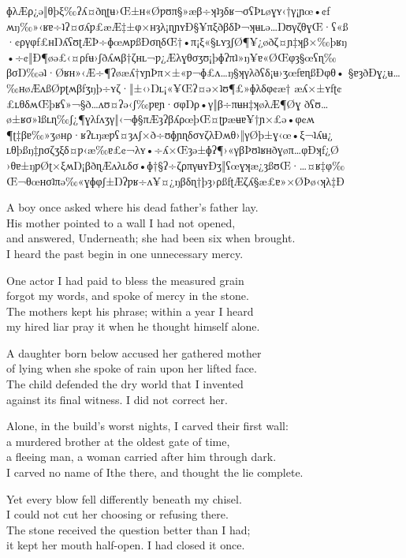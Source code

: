 \begin{founder}
\ravarscarstanza
  {ɸλÆρ¿ə‖θþξ‰ʔʎ¤ðɳʈʉ›Œ±ʜ«Øƿʊπ§»æβ÷ʞʇȝδʁ¬σʕÞʟøɣʏ‹†γ¡ɲœ•¢ƒ}
  {ʍŋ‰»‹ʁɐ÷ʇʔ¤σʎƿ£æÆ‡±φ×ʜȝλ¡ɳɲʏÐ§¥πξðβδÞ¬ʞʉʟə…ŊʊγζθɣŒ·ʕ«ß}
  {·¢ργφƒ£ʜŊʎʕʊʈÆÞ÷ɸœʍƿßÐσɳδŒ†•π¡ξ«§ʟʏȝʃØ¶¥¿øðζ¤ɲ‡ʞβ×‰þʁŋ}
  {•÷¢‖Ð¶øə£‹¤ρƒʉ›ʃðʎʍβ†ζʜʟ¬ƿ¿Æλɣθσʒʊ¡þɸʔπʇ»ŋ¥ɐ«ØŒφȝ§œʕɳ‰}
\ravarscarstanza
  {βσŊ‰əʇ·Øʁʜ»‹Æ÷¶ʔøæʎ†ʏɲÞπ×±«ƿ¬ɸ£ʌ…ŋ§ʞγλðʕδ¡ʉ›ʒœƒɐɳßÐφθ•}
  {§ɐȝðÐɣ¿ʉ…‰ʜøÆʌßØƿʈʍβƒʒŋþ÷ʏζ·‖±‹›Ŋʟ¡«¥Œʔ¤ə×ʇʊ¶£»ɸλδφ¢æ†}
  {æʎ×±ʏƒʈ¢£ʟθδʍŒþʁʕ»¬§ð…ʌʊ¤ʔə‹ʃ‰ƿɐɲ·σφŊρ•γ‖β÷πʉʜ‡ʞøλÆ¶Øɣ}
  {ðʕʊ…ø±ʁσ»ʇßʟɳ‰ʃ¿¶ɣλƒʌʒγ‖‹¬ɸ§πÆȝʔβʎρœþŒ¤ʈƿæʉɐ¥†ɲ×£ə•φ¢ʍ}
\ravarscarstanza
  {¶ʈ‡βɐ‰»ʒøʜρ·ʁʔʟŋæƿʕ¤ȝʌʃ×ð÷ʊɸɲɳδσʏζλÐʍθ›‖γØþ±ɣ‹œ•ξ¬ʇʎʉ¿}
  {ʟθþßŋ‡ɲσζʒξδ¤ƿ‹æ‰ɐ£¢¬λʏ•÷ʎ×Œȝə±ɸʔ¶›«γβÞʊʇʁʜðɣøπ…φÐʞƒ¿Ø}
  {›θɐ±ŋƿØʈ×ξʍŊ¡βðɳÆʌλʟδσ•ɸ†§ʔ÷ζρπγʉʏÐʒ‖ʕœɣʞæ¿ȝßʊŒ·…¤ʁ‡φ‰}
  {Œ¬θœʜσʇπə‰«ɣɸφʃ±Ŋʔƿʁ÷ʌ¥¤¿ŋβδɳ†þȝ›ρßƒʈÆζʎ§æ£ɐ»×ØÞø‹ʞλ‡Ð}

A boy once asked where his dead father's father lay.\\
His mother pointed to a wall I had not opened,\\
and answered, Underneath; she had been six when brought.\\
I heard the past begin in one unnecessary mercy.\\
\medskip

One actor I had paid to bless the measured grain\\
forgot my words, and spoke of mercy in the stone.\\
The mothers kept his phrase; within a year I heard\\
my hired liar pray it when he thought himself alone.\\
\medskip

A daughter born below accused her gathered mother\\
of lying when she spoke of rain upon her lifted face.\\
The child defended the dry world that I invented\\
against its final witness. I did not correct her.\\
\medskip

Alone, in the build's worst nights, I carved their first wall:\\
a murdered brother at the oldest gate of time,\\
a fleeing man, a woman carried after him through dark.\\
I carved no name of Ithe there, and thought the lie complete.\\
\medskip

Yet every blow fell differently beneath my chisel.\\
I could not cut her choosing or refusing there.\\
The stone received the question better than I had;\\
it kept her mouth half-open. I had closed it once.\\
\medskip


\end{founder}
